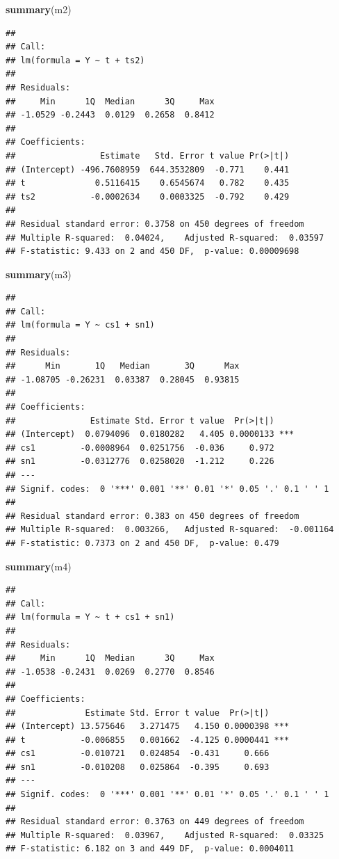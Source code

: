 \documentclass[
  10pt,
]{extarticle}
\newenvironment{Shaded}{\begin{snugshade}}{\end{snugshade}}
\newcommand{\FunctionTok}[1]{\textcolor[rgb]{0.13,0.29,0.53}{\textbf{#1}}}
\newcommand{\NormalTok}[1]{#1}
\begin{document}
\begin{Shaded}
\begin{Highlighting}[]
\FunctionTok{summary}\NormalTok{(m2)}
\end{Highlighting}
\end{Shaded}

\begin{verbatim}
## 
## Call:
## lm(formula = Y ~ t + ts2)
## 
## Residuals:
##     Min      1Q  Median      3Q     Max 
## -1.0529 -0.2443  0.0129  0.2658  0.8412 
## 
## Coefficients:
##                 Estimate   Std. Error t value Pr(>|t|)
## (Intercept) -496.7608959  644.3532809  -0.771    0.441
## t              0.5116415    0.6545674   0.782    0.435
## ts2           -0.0002634    0.0003325  -0.792    0.429
## 
## Residual standard error: 0.3758 on 450 degrees of freedom
## Multiple R-squared:  0.04024,    Adjusted R-squared:  0.03597 
## F-statistic: 9.433 on 2 and 450 DF,  p-value: 0.00009698
\end{verbatim}

\begin{Shaded}
\begin{Highlighting}[]
\FunctionTok{summary}\NormalTok{(m3)}
\end{Highlighting}
\end{Shaded}

\begin{verbatim}
## 
## Call:
## lm(formula = Y ~ cs1 + sn1)
## 
## Residuals:
##      Min       1Q   Median       3Q      Max 
## -1.08705 -0.26231  0.03387  0.28045  0.93815 
## 
## Coefficients:
##               Estimate Std. Error t value  Pr(>|t|)    
## (Intercept)  0.0794096  0.0180282   4.405 0.0000133 ***
## cs1         -0.0008964  0.0251756  -0.036     0.972    
## sn1         -0.0312776  0.0258020  -1.212     0.226    
## ---
## Signif. codes:  0 '***' 0.001 '**' 0.01 '*' 0.05 '.' 0.1 ' ' 1
## 
## Residual standard error: 0.383 on 450 degrees of freedom
## Multiple R-squared:  0.003266,   Adjusted R-squared:  -0.001164 
## F-statistic: 0.7373 on 2 and 450 DF,  p-value: 0.479
\end{verbatim}

\begin{Shaded}
\begin{Highlighting}[]
\FunctionTok{summary}\NormalTok{(m4)}
\end{Highlighting}
\end{Shaded}

\begin{verbatim}
## 
## Call:
## lm(formula = Y ~ t + cs1 + sn1)
## 
## Residuals:
##     Min      1Q  Median      3Q     Max 
## -1.0538 -0.2431  0.0269  0.2770  0.8546 
## 
## Coefficients:
##              Estimate Std. Error t value  Pr(>|t|)    
## (Intercept) 13.575646   3.271475   4.150 0.0000398 ***
## t           -0.006855   0.001662  -4.125 0.0000441 ***
## cs1         -0.010721   0.024854  -0.431     0.666    
## sn1         -0.010208   0.025864  -0.395     0.693    
## ---
## Signif. codes:  0 '***' 0.001 '**' 0.01 '*' 0.05 '.' 0.1 ' ' 1
## 
## Residual standard error: 0.3763 on 449 degrees of freedom
## Multiple R-squared:  0.03967,    Adjusted R-squared:  0.03325 
## F-statistic: 6.182 on 3 and 449 DF,  p-value: 0.0004011
\end{verbatim}
\end{document}
